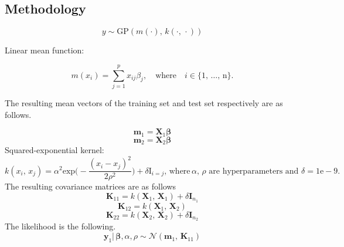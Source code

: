    \subsection{Methodology}
   
      $$y \sim \text{GP}(m(\cdot),\, k(\cdot,\, \cdot))$$

      Linear mean function:

      $$m(x_{i}) = \sum_{j=1}^{p} x_{ij}\beta_{j}, \quad \text{where} \quad i \in \{1,\, \ldots,\, \text{n}\}.$$

      The resulting mean vectors of the training set and test set respectively are as follows.

      $$\mathbf{m}_{1} = \mathbf{X}_{1}\boldsymbol{\beta}$$
      $$\mathbf{m}_{2} = \mathbf{X}_{2}\boldsymbol{\beta}$$
      Squared-exponential kernel:
      $$k(x_{i},\, x_{j}) = \alpha^2 \text{exp} \bigg(-\frac{(x_{i} - x_{j})^2}{2\rho^2} \bigg) + \delta\text{I}_{i=j}, \, \text{where} \, \alpha,\, \rho \text{ are hyperparameters and } \delta = 1\text{e}-9.$$
      The resulting covariance matrices are as follows
      $$\mathbf{K}_{11} = k(\mathbf{X}_{1},\, \mathbf{X}_{1}) + \delta\mathbf{I}_{n_{1}}$$
      $$\mathbf{K}_{12} = k(\mathbf{X}_{1},\, \mathbf{X}_{2})$$
      $$\mathbf{K}_{22} = k(\mathbf{X}_{2},\, \mathbf{X}_{2}) + \delta\mathbf{I}_{n_{2}}$$
      The likelihood is the following.
      $$\mathbf{y}_{1}|\, \boldsymbol{\beta}, \alpha, \rho \sim \mathcal{N}(\mathbf{m}_{1},\, \mathbf{K}_{11})$$

